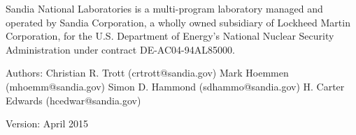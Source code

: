 \documentclass[a4paper,11pt]{book}
\begin{document}

\noindent
Sandia National Laboratories is a multi-program laboratory managed and operated by Sandia 
Corporation, a wholly owned subsidiary of Lockheed Martin Corporation, for the U.S. 
Department of Energy's National Nuclear Security Administration under contract DE-AC04-94AL85000.

\vspace{4cm}
\noindent 
Authors: \newline\newline
Christian R. Trott (crtrott@sandia.gov)\newline
Mark Hoemmen (mhoemm@sandia.gov)\newline
Simon D. Hammond (sdhammo@sandia.gov)\newline
H. Carter Edwards (hcedwar@sandia.gov)

\vspace{1cm}
\noindent 
Version: \newline{} April 2015

\tableofcontents












\clearpage


%
\end{document}
